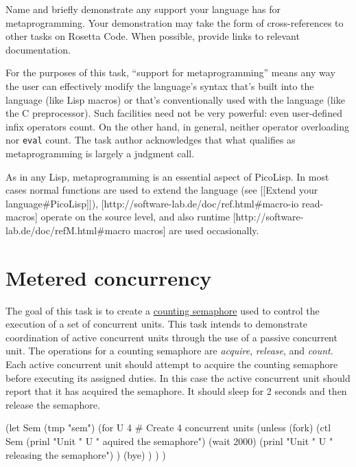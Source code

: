 Name and briefly demonstrate any support your language has for
metaprogramming. Your demonstration may take the form of
cross-references to other tasks on Rosetta Code. When possible, provide
links to relevant documentation.

For the purposes of this task, ``support for metaprogramming'' means any
way the user can effectively modify the language's syntax that's built
into the language (like Lisp macros) or that's conventionally used with
the language (like the C preprocessor). Such facilities need not be very
powerful: even user-defined infix operators count. On the other hand, in
general, neither operator overloading nor \texttt{eval} count. The task
author acknowledges that what qualifies as metaprogramming is largely a
judgment call.


\begin{wideverbatim}

As in any Lisp, metaprogramming is an essential aspect of PicoLisp.
In most cases normal functions are used to extend the language
(see [[Extend your language#PicoLisp]]),
[http://software-lab.de/doc/ref.html#macro-io read-macros] operate on
the source level, and also runtime
[http://software-lab.de/doc/refM.html#macro macros] are used occasionally.

\end{wideverbatim}

\pagebreak{}
\section*{Metered concurrency}

The goal of this task is to create a
\href{http://en.wikipedia.org/wiki/Counting\_semaphore}{counting
  semaphore} used to control the execution of a set of concurrent
units. This task intends to demonstrate coordination of active
concurrent units through the use of a passive concurrent unit. The
operations for a counting semaphore are \emph{acquire},
\emph{release}, and \emph{count}. Each active concurrent unit should
attempt to acquire the counting semaphore before executing its
assigned duties. In this case the active concurrent unit should report
that it has acquired the semaphore. It should sleep for 2 seconds and
then release the semaphore.

\begin{wideverbatim}

(let Sem (tmp "sem")
   (for U 4  # Create 4 concurrent units
      (unless (fork)
         (ctl Sem
            (prinl "Unit " U " aquired the semaphore")
            (wait 2000)
            (prinl "Unit " U " releasing the semaphore") )
         (bye) ) ) )

\end{wideverbatim}

